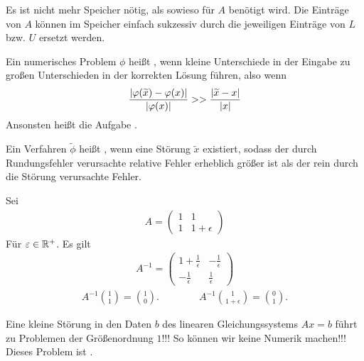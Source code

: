 \documentclass{report}
\begin{document}
\begin{proposition}
	Es ist nicht mehr Speicher nötig, als sowieso für $A$ benötigt wird. Die Einträge von $A$ können im Speicher einfach sukzessiv durch die jeweiligen Einträge von $L$ bzw. $U$ ersetzt werden.
\end{proposition}
\begin{definition}
	Ein numerisches Problem $\phi$ heißt , wenn kleine Unterschiede in der Eingabe zu großen Unterschieden in der korrekten Lösung führen, also wenn
	\begin{align*}
		\frac{\abs{\varphi(\widetilde{x}) - \varphi(x)}}{\abs{\varphi(x)}} >> \frac{\abs{\widetilde{x} - x}}{\abs{x}}
	\end{align*}
	Ansonsten heißt die Aufgabe .
\end{definition}
\begin{definition}
	Ein Verfahren $\tilde{\phi}$ heißt , wenn eine Störung $\tilde{x}$ existiert, sodass der durch Rundungsfehler verursachte relative Fehler erheblich größer ist als der rein durch die Störung verursachte Fehler.
\end{definition}
\begin{example}
	Sei 
	\begin{align*}
		A = \begin{pmatrix}
			1 & 1\\ 
			1 & 1 + \epsilon
		\end{pmatrix}
	\end{align*}
	Für $\varepsilon \in \mathbb{R}^+$. Es gilt
	\begin{align*}
		A^{-1} = \begin{pmatrix}
			1 + \frac{1}{\epsilon} & -\frac{1}{\epsilon}\\ 
			- \frac{1}{\epsilon} & \frac{1}{\epsilon}
		\end{pmatrix}
	\end{align*}
	\begin{align*}
		A^{-1} \binom{1}{1} = \binom{1}{0}. \qquad \qquad A^{-1} \binom{1}{1 + \epsilon} = \binom{0}{1}.
	\end{align*}
\end{example}
\noindent Eine kleine Störung in den Daten $b$ des linearen Gleichungssystems $Ax = b$ führt zu Problemen der Größenordnung $1$!!! So können wir keine Numerik machen!!! Dieses Problem ist .
\end{document}
